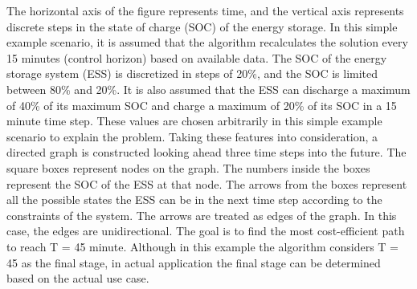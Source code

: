 The horizontal axis of the figure represents time, and the vertical axis represents discrete steps in the state of charge (SOC) of the energy storage. In this simple example scenario, it is assumed that the algorithm recalculates the solution every 15 minutes (control horizon) based on available data. The SOC of the energy storage system (ESS) is discretized in steps of 20\%, and the SOC is limited between 80\% and 20\%. It is also assumed that the ESS can discharge a maximum of 40\% of its maximum SOC and charge a maximum of 20\% of its SOC in a 15 minute time step. These values are chosen arbitrarily in this simple example scenario to explain the problem. Taking these features into consideration, a directed graph is constructed looking ahead three time steps into the future. The square boxes represent nodes on the graph. The numbers inside the boxes represent the SOC of the ESS at that node. The arrows from the boxes represent all the possible states the ESS can be in the next time step according to the constraints of the system. The arrows are treated as edges of the graph. In this case, the edges are unidirectional. The goal is to find the most cost-efficient path to reach T = 45 minute. Although in this example the algorithm considers T = 45 as the final stage, in actual application the final stage can be determined based on the actual use case.


